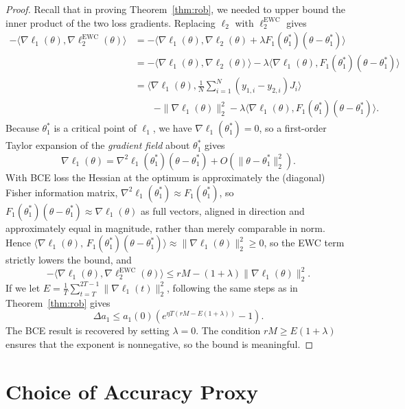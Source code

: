 \documentclass[pmlr]{jmlr} %
\begin{document}
\begin{proof}
Recall that in proving Theorem~\ref{thm:rob}, we needed to upper bound the inner product of the two loss gradients. Replacing $\ell_2$ with $\ell_2^{\mathrm{EWC}}$ gives
\begin{align*}
-\langle \nabla \ell_1(\theta), \nabla \ell_2^{\mathrm{EWC}}(\theta) \rangle &= -\langle \nabla \ell_1(\theta), \nabla \ell_2(\theta) + \lambda F_1(\theta^*_{1}) (\theta - \theta^*_{1}) \rangle\\
&= -\langle \nabla \ell_1(\theta), \nabla \ell_2(\theta) \rangle - \lambda \langle \nabla \ell_1(\theta), F_1(\theta^*_{1}) (\theta - \theta^*_{1}) \rangle\\
&= \langle \nabla \ell_1(\theta), \frac{1}{N}\sum_{i=1}^N (y_{1,i}-y_{2,i}) J_i \rangle \\
&\qquad - \|\nabla \ell_1(\theta)\|_2^2 - \lambda \langle \nabla \ell_1(\theta), F_1(\theta^*_{1}) (\theta - \theta^*_{1}) \rangle.
\end{align*}
Because $\theta_1^*$ is a critical point of $\ell_1$, we have $\nabla \ell_1(\theta_1^*)=0$, so a first-order Taylor expansion of the \emph{gradient field} about $\theta_1^*$ gives
\[
\nabla \ell_1(\theta) = \nabla^2 \ell_1(\theta_1^*)(\theta - \theta_1^*) + O(\|\theta - \theta_1^*\|_2^2).
\]
With BCE loss the Hessian at the optimum is approximately the (diagonal) Fisher information matrix, $\nabla^2 \ell_1(\theta_1^*)\approx F_1(\theta_1^*)$, so $F_1(\theta^*_{1})(\theta - \theta^*_{1})\approx\nabla \ell_1(\theta)$ as full vectors, aligned in direction and approximately equal in magnitude, rather than merely comparable in norm. Hence $\langle \nabla \ell_1(\theta),\, F_1(\theta_1^*)(\theta - \theta_1^*)\rangle \approx \|\nabla \ell_1(\theta)\|_2^2 \ge 0$, so the EWC term strictly lowers the bound, and
\[
-\langle \nabla \ell_1(\theta), \nabla \ell_2^{\mathrm{EWC}}(\theta) \rangle \le rM - (1+\lambda) \|\nabla \ell_1(\theta)\|_2^2.
\]
If we let $E = \frac{1}{T}\sum_{t=T}^{2T-1} \|\nabla \ell_1(t)\|_2^2$, following the same steps as in Theorem~\ref{thm:rob} gives
\[
\Delta a_1 \le a_1(0)(e^{\eta T(rM - E(1+\lambda))}-1).
\]
The BCE result is recovered by setting $\lambda=0$. The condition $rM \ge E(1+\lambda)$ ensures that the exponent is nonnegative, so the bound is meaningful.
\end{proof}

\section{Choice of Accuracy Proxy}
\label{app:accuracy}
\end{document}
